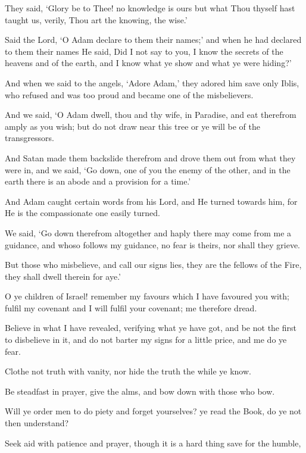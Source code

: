 \documentclass[fontsize=14pt, letterpaper, notitlepage, openany, DIV=12]{scrbook} %
\begin{document}
\noindent[2:32]
They said, `Glory be to Thee! no knowledge is ours but what Thou thyself hast taught us,
verily, Thou art the knowing, the wise.'

\noindent[2:33]
Said the Lord, `O Adam declare to them their names;' and when he had declared to them
their names He said, Did I not say to you, I know the secrets of the heavens and of the earth, and
I know what ye show and what ye were hiding?'

\noindent[2:34]
And when we said to the angels, `Adore Adam,' they adored him save only Iblis, who
refused and was too proud and became one of the misbelievers.

\noindent[2:35]
And we said, `O Adam dwell, thou and thy wife, in Paradise, and eat therefrom amply as
you wish; but do not draw near this tree or ye will be of the transgressors.

\noindent[2:36]
And Satan made them backslide therefrom and drove them out from what they were in,
and we said, `Go down, one of you the enemy of the other, and in the earth there is an abode and
a provision for a time.'

\noindent[2:37]
And Adam caught certain words from his Lord, and He turned towards him, for He is the
compassionate one easily turned.

\noindent[2:38]
We said, `Go down therefrom altogether and haply there may come from me a guidance,
and whoso follows my guidance, no fear is theirs, nor shall they grieve.

\noindent[2:39]
But those who misbelieve, and call our signs lies, they are the fellows of the Fire, they
shall dwell therein for aye.'

\noindent[2:40]
O ye children of Israel! remember my favours which I have favoured you with; fulfil my
covenant and I will fulfil your covenant; me therefore dread.

\noindent[2:41]
Believe in what I have revealed, verifying what ye have got, and be not the first to
disbelieve in it, and do not barter my signs for a little price, and me do ye fear.

\noindent[2:42]
Clothe not truth with vanity, nor hide the truth the while ye know.

\noindent[2:43]
Be steadfast in prayer, give the alms, and bow down with those who bow.

\noindent[2:44]
Will ye order men to do piety and forget yourselves? ye read the Book, do ye not then
understand?

\noindent[2:45]
Seek aid with patience and prayer, though it is a hard thing save for the humble,
\end{document}

